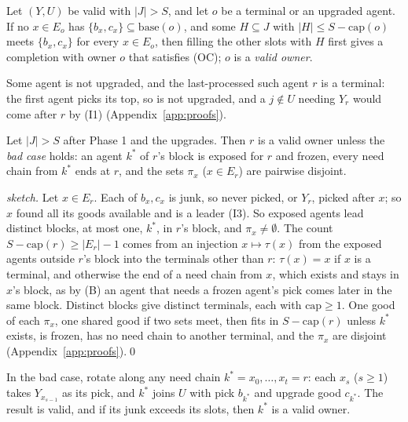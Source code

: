 \documentclass[runningheads,11pt]{llncs}
\newcommand{\capa}{\mathrm{cap}}
\newcommand{\base}{\mathrm{base}}
\begin{document}
\begin{lemma}\label{lem:owner}
Let $(Y,U)$ be valid with $|J|>S$, and let $o$ be a terminal or an upgraded agent. If no $x\in E_o$ has $\{b_x,c_x\}\subseteq\base(o)$, and some $H\subseteq J$ with $|H|\le S-\capa(o)$ meets $\{b_x,c_x\}$ for every $x\in E_o$, then filling the other slots with $H$ first gives a completion with owner $o$ that satisfies (OC); $o$ is a \emph{valid owner}.
\end{lemma}

\begin{lemma}\label{lem:r}
Some agent is not upgraded, and the last-processed such agent $r$ is a terminal: the first agent picks its top, so is not upgraded, and a $j\notin U$ needing $Y_r$ would come after $r$ by (I1) (Appendix~\ref{app:proofs}).
\end{lemma}

\begin{theorem}\label{thm:A}
Let $|J|>S$ after Phase 1 and the upgrades. Then $r$ is a valid owner unless the \emph{bad case} holds: an agent $k^*$ of $r$'s block is exposed for $r$ and frozen, every need chain from $k^*$ ends at $r$, and the sets $\pi_x$ ($x\in E_r$) are pairwise disjoint.
\end{theorem}

\begin{proof}[sketch]
Let $x\in E_r$. Each of $b_x,c_x$ is junk, so never picked, or $Y_r$, picked after $x$; so $x$ found all its goods available and is a leader (I3). So exposed agents lead distinct blocks, at most one, $k^*$, in $r$'s block, and $\pi_x\ne\emptyset$. The count $S-\capa(r)\ge|E_r|-1$ comes from an injection $x\mapsto\tau(x)$ from the exposed agents outside $r$'s block into the terminals other than $r$: $\tau(x)=x$ if $x$ is a terminal, and otherwise the end of a need chain from $x$, which exists and stays in $x$'s block, as by (B) an agent that needs a frozen agent's pick comes later in the same block. Distinct blocks give distinct terminals, each with $\capa\ge1$. One good of each $\pi_x$, one shared good if two sets meet, then fits in $S-\capa(r)$ unless $k^*$ exists, is frozen, has no need chain to another terminal, and the $\pi_x$ are disjoint (Appendix~\ref{app:proofs}).\qed
\end{proof}

\begin{theorem}[rotation]\label{thm:B}
In the bad case, rotate along any need chain $k^*=x_0,\dots,x_t=r$: each $x_s$ ($s\ge1$) takes $Y_{x_{s-1}}$ as its pick, and $k^*$ joins $U$ with pick $b_{k^*}$ and upgrade good $c_{k^*}$. The result is valid, and if its junk exceeds its slots, then $k^*$ is a valid owner.
\end{theorem}
\end{document}
